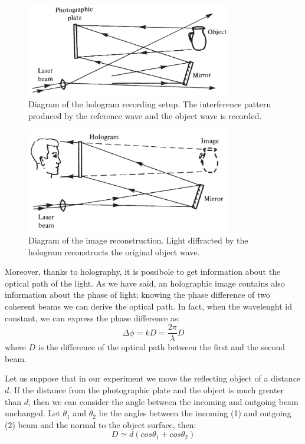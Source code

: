 \documentclass[11pt,a4paper]{article}
\begin{document}
\begin{figure}[ht]
\centering
\includegraphics[width=0.8\textwidth]{Hologram_recording}
\caption{Diagram of the hologram recording setup. The interference pattern produced by the reference wave and the object wave is recorded.\cite{hariharan_2002}}
\label{fig:hologram_recording}
\end{figure}

\begin{figure}[ht]
\centering
\includegraphics[width=0.8\textwidth]{Hologram_image_reconstruction}
\caption{Diagram of the image reconstruction. Light diffracted by the hologram reconstructs the original object wave.\cite{hariharan_2002}}
\label{fig:hologram_reconstruction}
\end{figure}

Moreover, thanks to holography, it is possibole to get information about the optical path of the light. As we have said, an holographic image contains also information about the phase of light; knowing the phase difference of two coherent beams we can derive the optical path. In fact, when the wavelenght id constant, we can express the phase difference as:
\begin{equation}
\Delta \phi=kD=\frac{2\pi}{\lambda}D\label{eq:Delphi}
\end{equation}
where $D$ is the difference of the optical path between the first and the second beam.

Let us suppose that in our experiment we move the reflecting object of a distance $d$. If the distance from the photographic plate and the object is much greater than $d$, then we can consider the angle between the incoming and outgoing beam unchanged. Let $\theta_1$ and $\theta_2$ be the angles between the incoming (1) and outgoing (2) beam and the normal to the object surface, then: 
\begin{equation}
D\simeq d(cos\theta_1+cos\theta_2)\label{eq:D}
\end{equation}
\end{document}
